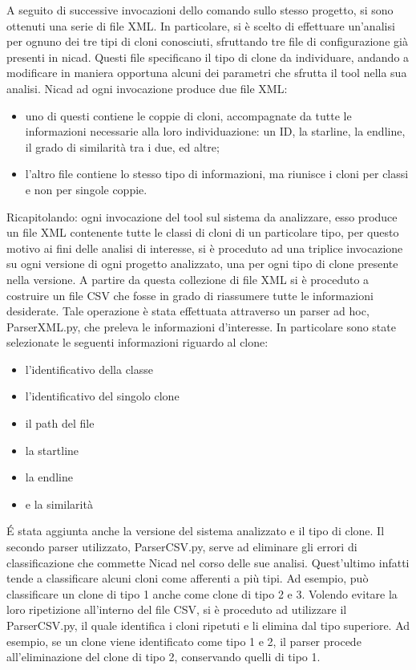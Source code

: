 A seguito di successive invocazioni dello comando sullo stesso progetto, si sono ottenuti una serie di file XML. In particolare, si è scelto di effettuare un'analisi per ognuno dei tre tipi di cloni conosciuti, sfruttando tre file di configurazione già presenti in nicad. Questi file specificano il tipo di clone da individuare, andando a modificare in maniera opportuna alcuni dei parametri che sfrutta il tool nella sua analisi. Nicad ad ogni invocazione produce due file XML:
\begin{itemize}
	\item uno di questi contiene le coppie di cloni, accompagnate da tutte le informazioni necessarie alla loro individuazione: un ID, la starline, la endline, il grado di similarità tra i due, ed altre;
	\item l'altro file contiene lo stesso tipo di informazioni, ma riunisce i cloni per classi e non per singole coppie.
\end{itemize}
Ricapitolando: ogni invocazione del tool sul sistema da analizzare, esso produce un file XML contenente tutte le classi di cloni di un particolare tipo, per questo motivo ai fini delle analisi di interesse, si è proceduto ad una triplice invocazione su ogni versione di ogni progetto analizzato, una per ogni tipo di clone presente nella versione.
A partire da questa collezione di file XML si è proceduto a costruire un file CSV che fosse in grado di riassumere tutte le informazioni desiderate. Tale operazione è stata effettuata attraverso un parser ad hoc, ParserXML.py, che preleva le informazioni d'interesse. In particolare sono state selezionate le seguenti informazioni riguardo al clone:
\begin{itemize}
\item l'identificativo della classe
\item l'identificativo del singolo clone
\item il path del file
\item la startline
\item la endline
\item e la similarità
\end{itemize} 
\'E stata aggiunta anche la versione del sistema analizzato e il tipo di clone. 
Il secondo parser utilizzato, ParserCSV.py, serve ad eliminare gli errori di classificazione che commette Nicad nel corso delle sue analisi. Quest'ultimo infatti tende a classificare alcuni cloni come afferenti a più tipi. Ad esempio, può classificare un clone di tipo 1 anche come clone di tipo 2 e 3. Volendo evitare la loro ripetizione all'interno del file CSV, si è proceduto ad utilizzare il ParserCSV.py, il quale identifica i cloni ripetuti e li elimina dal tipo superiore. Ad esempio, se un clone viene identificato come tipo 1 e 2, il parser procede all'eliminazione del clone di tipo 2, conservando quelli di tipo 1.